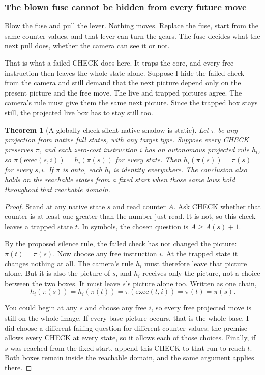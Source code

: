 \documentclass[11pt,twoside]{article}
\theoremstyle{thielethm}
\newtheorem{theorem}{Theorem}[section]
\theoremstyle{thieledef}
\theoremstyle{thieledef}
\theoremstyle{thieledef}
\theoremstyle{thielethm}
\theoremstyle{thieleobs}
\theoremstyle{thielethm}
\begin{document}
\subsubsection*{The blown fuse cannot be hidden from every future move}

Blow the fuse and pull the lever. Nothing moves. Replace the fuse, start from the same
counter values, and that lever can turn the gears. The fuse decides what the next pull
does, whether the camera can see it or not.

That is what a failed CHECK does here. It traps the core, and every free instruction
then leaves the whole state alone. Suppose I hide the failed check from the camera and
still demand that the next picture depend only on the present picture and the free move.
The live and trapped pictures agree. The camera's rule must give them the same next
picture. Since the trapped box stays still, the projected live box has to stay still too.

\begin{theorem}[A globally check-silent native shadow is static]\label{thm:native-static-shadow}
Let $\pi$ be any projection from native full states, with any target type. Suppose every
CHECK preserves $\pi$, and each zero-cost instruction $i$ has an autonomous projected
rule $h_i$, so $\pi(\mathrm{exec}(s,i))=h_i(\pi(s))$ for every state. Then
$h_i(\pi(s))=\pi(s)$ for every $s,i$. If $\pi$ is onto, each $h_i$ is identity everywhere.
The conclusion also holds on the reachable states from a fixed start when those same
laws hold throughout that reachable domain.
\end{theorem}
\begin{proof}
Stand at any native state $s$ and read counter $A$. Ask CHECK whether that
counter is at least one greater than the number just read. It is not, so
this check leaves a trapped state $t$. In symbols, the chosen question is
$A\ge A(s)+1$.

By the proposed silence rule, the failed check has not changed the picture:
$\pi(t)=\pi(s)$. Now choose any free instruction $i$. At the trapped state
it changes nothing at all. The camera's rule $h_i$ must therefore leave
that picture alone. But it is also the picture of $s$, and $h_i$ receives
only the picture, not a choice between the two boxes. It must leave $s$'s
picture alone too. Written as one chain,
\[
 h_i(\pi(s))=h_i(\pi(t))=\pi(\mathrm{exec}(t,i))=\pi(t)=\pi(s).
\]

You could begin at any $s$ and choose any free $i$, so every free projected
move is still on the whole image. If every base picture occurs, that is
the whole base. I did choose a different failing question for different
counter values; the premise allows every CHECK at every state, so it
allows each of those choices. Finally, if $s$ was reached from the fixed
start, append this CHECK to that run to reach $t$. Both boxes remain inside
the reachable domain, and the same argument applies there.
\end{proof}
\end{document}
